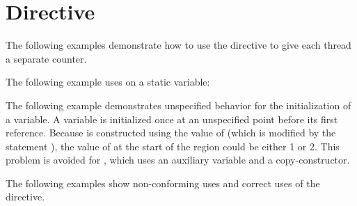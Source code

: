 \section{ Directive}
\label{sec:threadprivate}

The following examples demonstrate how to use the  directive 
 to give each thread a separate counter.



\begin{ccppspecific}
The following example uses  on a static variable:


The following example demonstrates unspecified behavior for the initialization 
of a  variable. A   variable is initialized 
once at an unspecified point before its first reference. Because  is 
constructed using the value of   (which is modified by the statement 
), the value of   at the start of the  
region could be either 1 or 2. This problem is avoided for , which uses 
an auxiliary  variable and a copy-constructor.

\pagebreak
{}
\end{ccppspecific}

The following examples show non-conforming uses and correct uses of the  
directive. 

